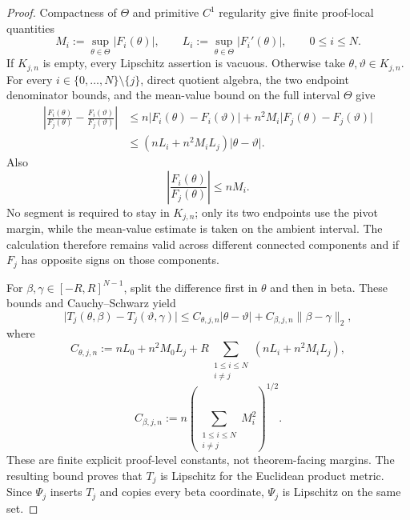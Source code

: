 \begin{proof}
Compactness of \(\Theta\) and primitive \(C^1\) regularity give finite
proof-local quantities
\begin{equation}
\label{eq:appendix-display-072}
M_i:=\sup_{\theta\in\Theta}\lvert F_i(\theta)\rvert,
\qquad
L_i:=\sup_{\theta\in\Theta}\lvert F_i'(\theta)\rvert,
\qquad 0\leq i\leq N.
\end{equation}
If \(K_{j,n}\) is empty, every Lipschitz assertion is vacuous. Otherwise take
\(\theta,\vartheta\in K_{j,n}\). For every \(i\in\{0,\ldots,N\}\setminus\{j\}\), direct quotient algebra,
the two endpoint denominator bounds, and the mean-value bound on the full interval \(\Theta\) give
\begin{equation}
\label{eq:appendix-display-073}
\begin{aligned}
\left\lvert
\frac{F_i(\theta)}{F_j(\theta)}
-\frac{F_i(\vartheta)}{F_j(\vartheta)}
\right\rvert
&\leq
n\lvert F_i(\theta)-F_i(\vartheta)\rvert
+n^2M_i\lvert F_j(\theta)-F_j(\vartheta)\rvert\\
&\leq
(nL_i+n^2M_iL_j)\lvert\theta-\vartheta\rvert.
\end{aligned}
\end{equation}
Also
\begin{equation}
\label{eq:appendix-display-074}
\left\lvert\frac{F_i(\theta)}{F_j(\theta)}\right\rvert\leq nM_i.
\end{equation}
No segment is required to stay in \(K_{j,n}\); only its two endpoints use the pivot margin, while the
mean-value estimate is taken on the ambient interval. The calculation therefore remains valid across
different connected components and if \(F_j\) has opposite signs on those components.

For \(\beta,\gamma\in[-R,R]^{N-1}\), split the difference first in \(\theta\) and then in beta. These
bounds and Cauchy--Schwarz yield
\begin{equation}
\label{eq:appendix-display-075}
\lvert T_j(\theta,\beta)-T_j(\vartheta,\gamma)\rvert
\leq
C_{\theta,j,n}\lvert\theta-\vartheta\rvert
+C_{\beta,j,n}\lVert\beta-\gamma\rVert_2,
\end{equation}
where
\begin{equation}
\label{eq:appendix-display-076}
C_{\theta,j,n}
:=nL_0+n^2M_0L_j
+R\sum_{\substack{1\leq i\leq N\\i\neq j}}
(nL_i+n^2M_iL_j),
\end{equation}
\begin{equation}
\label{eq:appendix-display-077}
C_{\beta,j,n}
:=n\left(\sum_{\substack{1\leq i\leq N\\i\neq j}}M_i^2\right)^{1/2}.
\end{equation}
These are finite explicit proof-level constants, not theorem-facing margins. The resulting bound proves that
\(T_j\) is Lipschitz for the Euclidean product metric. Since \(\Psi_j\) inserts \(T_j\) and copies every beta
coordinate, \(\Psi_j\) is Lipschitz on the same set.


\end{proof}
